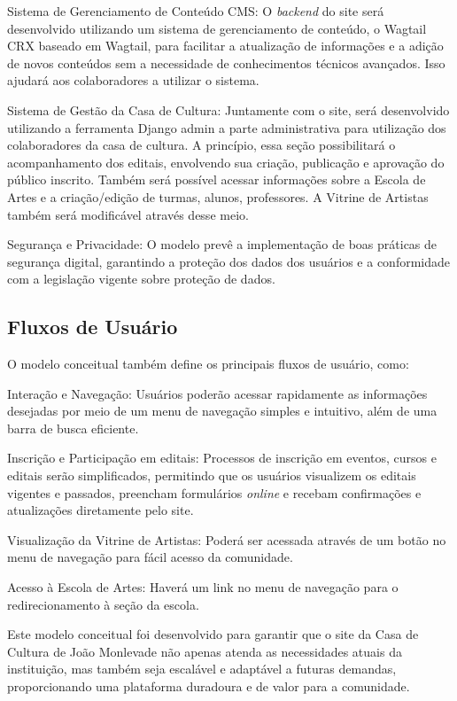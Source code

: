 Sistema de Gerenciamento de Conteúdo \ac{CMS}: O \textit{backend} do site será desenvolvido utilizando um sistema de gerenciamento de conteúdo, o Wagtail CRX baseado em Wagtail, para facilitar a atualização de informações e a adição de novos conteúdos sem a necessidade de conhecimentos técnicos avançados. Isso ajudará aos colaboradores a utilizar o sistema.

Sistema de Gestão da Casa de Cultura: Juntamente com o site, será desenvolvido utilizando a ferramenta Django admin a parte administrativa para utilização dos colaboradores da casa de cultura. A princípio, essa seção possibilitará o acompanhamento dos editais, envolvendo sua criação, publicação e aprovação do público inscrito. Também será possível acessar informações sobre a Escola de Artes e a criação/edição de turmas, alunos, professores. A Vitrine de Artistas também será modificável através desse meio.

Segurança e Privacidade: O modelo prevê a implementação de boas práticas de segurança digital, garantindo a proteção dos dados dos usuários e a conformidade com a legislação vigente sobre proteção de dados.

\subsection{Fluxos de Usuário}

O modelo conceitual também define os principais fluxos de usuário, como:

Interação e Navegação: Usuários poderão acessar rapidamente as informações desejadas por meio de um menu de navegação simples e intuitivo, além de uma barra de busca eficiente.

Inscrição e Participação em editais: Processos de inscrição em eventos, cursos e editais serão simplificados, permitindo que os usuários visualizem os editais vigentes e passados, preencham formulários \textit{online} e recebam confirmações e atualizações diretamente pelo site.

Visualização da Vitrine de Artistas: Poderá ser acessada através de um botão no menu de navegação para fácil acesso da comunidade.

Acesso à Escola de Artes: Haverá um link no menu de navegação para o redirecionamento à seção da escola.

Este modelo conceitual foi desenvolvido para garantir que o site da Casa de Cultura de João Monlevade não apenas atenda as necessidades atuais da instituição, mas também seja escalável e adaptável a futuras demandas, proporcionando uma plataforma duradoura e de valor para a comunidade.

